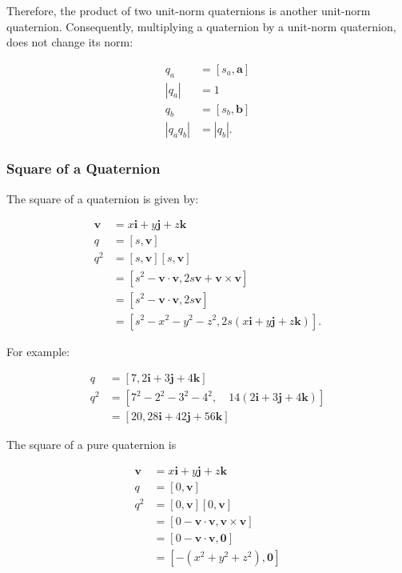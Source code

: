 \documentclass[10pt]{article}
\begin{document}
Therefore, the product of two unit-norm quaternions is another unit-norm quaternion. Consequently, multiplying a quaternion by a unit-norm quaternion, does not change its norm:

$$
\begin{aligned}
q_{a} & =\left[s_{a}, \mathbf{a}\right] \\
\left|q_{a}\right| & =1 \\
q_{b} & =\left[s_{b}, \mathbf{b}\right] \\
\left|q_{a} q_{b}\right| & =\left|q_{b}\right| .
\end{aligned}
$$

\subsubsection{Square of a Quaternion}
The square of a quaternion is given by:

$$
\begin{aligned}
\mathbf{v} & =x \mathbf{i}+y \mathbf{j}+z \mathbf{k} \\
q & =[s, \mathbf{v}] \\
q^{2} & =[s, \mathbf{v}][s, \mathbf{v}] \\
& =\left[s^{2}-\mathbf{v} \cdot \mathbf{v}, 2 s \mathbf{v}+\mathbf{v} \times \mathbf{v}\right] \\
& =\left[s^{2}-\mathbf{v} \cdot \mathbf{v}, 2 s \mathbf{v}\right] \\
& =\left[s^{2}-x^{2}-y^{2}-z^{2}, 2 s(x \mathbf{i}+y \mathbf{j}+z \mathbf{k})\right] .
\end{aligned}
$$

For example:

$$
\begin{aligned}
q & =[7,2 \mathbf{i}+3 \mathbf{j}+4 \mathbf{k}] \\
q^{2} & =\left[7^{2}-2^{2}-3^{2}-4^{2}, \quad 14(2 \mathbf{i}+3 \mathbf{j}+4 \mathbf{k})\right] \\
& =[20,28 \mathbf{i}+42 \mathbf{j}+56 \mathbf{k}]
\end{aligned}
$$

The square of a pure quaternion is

$$
\begin{aligned}
\mathbf{v} & =x \mathbf{i}+y \mathbf{j}+z \mathbf{k} \\
q & =[0, \mathbf{v}] \\
q^{2} & =[0, \mathbf{v}][0, \mathbf{v}] \\
& =[0-\mathbf{v} \cdot \mathbf{v}, \mathbf{v} \times \mathbf{v}] \\
& =[0-\mathbf{v} \cdot \mathbf{v}, \mathbf{0}] \\
& =\left[-\left(x^{2}+y^{2}+z^{2}\right), \mathbf{0}\right]
\end{aligned}
$$
\end{document}
